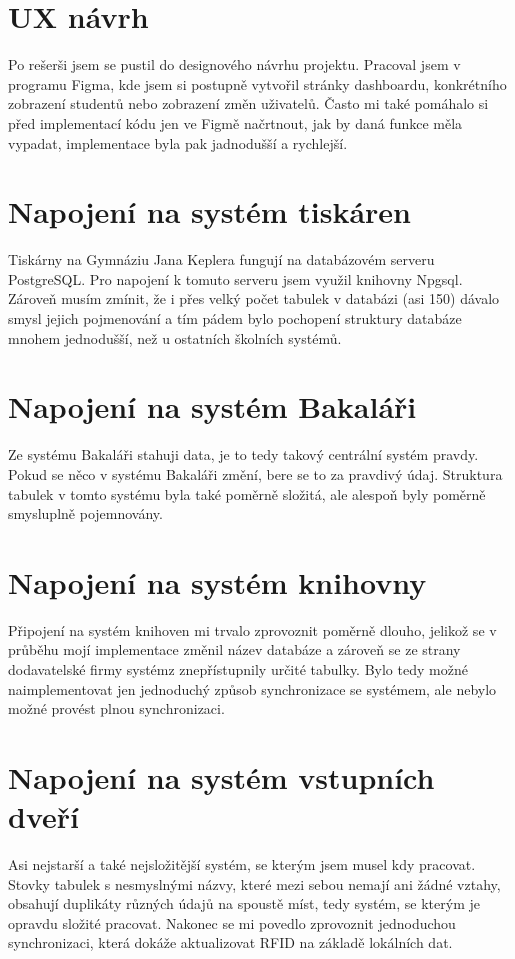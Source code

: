 \documentclass[11pt,a4paper,twoside,openright]{report}
\begin{document}
\section{UX návrh}
Po rešerši jsem se pustil do designového návrhu projektu. Pracoval jsem v programu Figma, kde jsem si postupně vytvořil stránky dashboardu, konkrétního zobrazení studentů nebo zobrazení změn uživatelů. Často mi také pomáhalo si před implementací kódu jen ve Figmě načrtnout, jak by daná funkce měla vypadat, implementace byla pak jadnodušší a rychlejší.
\section{Napojení na systém tiskáren}
Tiskárny na Gymnáziu Jana Keplera fungují na databázovém serveru PostgreSQL. Pro napojení k tomuto serveru jsem využil knihovny Npgsql. Zároveň musím zmínit, že i přes velký počet tabulek v databázi (asi 150) dávalo smysl jejich pojmenování a tím pádem bylo pochopení struktury databáze mnohem jednodušší, než u ostatních školních systémů.
\section{Napojení na systém Bakaláři}
Ze systému Bakaláři stahuji data, je to tedy takový centrální systém pravdy. Pokud se něco v systému Bakaláři změní, bere se to za pravdivý údaj. Struktura tabulek v tomto systému byla také poměrně složitá, ale alespoň byly poměrně smysluplně pojemnovány.
\section{Napojení na systém knihovny}
Připojení na systém knihoven mi trvalo zprovoznit poměrně dlouho, jelikož se v průběhu mojí implementace změnil název databáze a zároveň se ze strany dodavatelské firmy systémz znepřístupnily určité tabulky. Bylo tedy možné naimplementovat jen jednoduchý způsob synchronizace se systémem, ale nebylo možné provést plnou synchronizaci.  
\section{Napojení na systém vstupních dveří}
Asi nejstarší a také nejsložitější systém, se kterým jsem musel kdy pracovat. Stovky tabulek s nesmyslnými názvy, které mezi sebou nemají ani žádné vztahy, obsahují duplikáty různých údajů na spoustě míst, tedy systém, se kterým je opravdu složité pracovat. Nakonec se mi povedlo zprovoznit jednoduchou synchronizaci, která dokáže aktualizovat RFID na základě lokálních dat.
\end{document}
